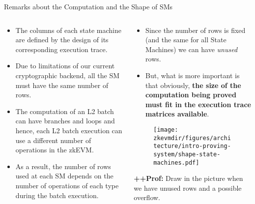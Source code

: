 \begin{frame}{Remarks about the Computation and the Shape of SMs}
\begin{columns}
\begin{column}{0.48 \textwidth}
\begin{itemize}
\small
\item The columns of each state machine are defined by
the design of its corresponding execution trace.
\item Due to limitations of our current cryptographic backend, all the SM must have the same number of rows.
\item The computation of an L2 batch can have branches and loops and hence, 
each L2 batch execution can use a different number of operations in the zkEVM.
\item As a result, the number of rows used at each SM depends on the
number of operations of each type during the batch execution.
\end{itemize}
\end{column}

\begin{column}{0.5 \textwidth}
\begin{itemize}
\small
\item Since the number of rows is fixed (and the same for all State Machines) we
can have \textit{unused} rows.
\item But, what is more important is that obviously, \textbf{the size of the computation being proved must fit 
in the execution trace matrices available}.
\end{itemize}
\begin{figure}
\texttt{[image: \\zkevmdir/figures/architecture/intro-proving-system/shape-state-machines.pdf]}
\end{figure}

\ifPROF
\vspace{0.2cm}
\scriptsize
\textbf{++Prof:} Draw in the picture when we have unused rows and a possible overflow.
\normalsize
\fi

\end{column}
\end{columns}
\end{frame}



